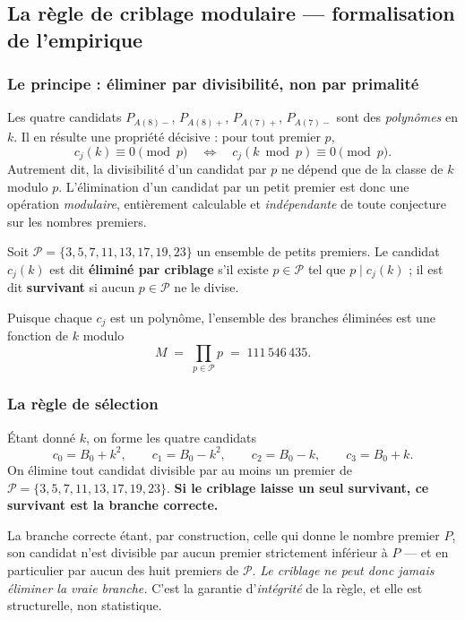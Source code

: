 \subsection{La règle de criblage modulaire --- formalisation de l'empirique}

\subsubsection{Le principe : éliminer par divisibilité, non par primalité}

Les quatre candidats $P_{A(8)-}$, $P_{A(8)+}$, $P_{A(7)+}$, $P_{A(7)-}$ sont des
\emph{polynômes} en $k$. Il en résulte une propriété décisive : pour
tout premier $p$,
\[
  c_j(k) \equiv 0 \!\!\pmod p
  \quad\Longleftrightarrow\quad
  c_j(k \bmod p) \equiv 0 \!\!\pmod p .
\]
Autrement dit, la divisibilité d'un candidat par $p$ ne dépend que de la
classe de $k$ modulo $p$. L'élimination d'un candidat par un petit
premier est donc une opération \emph{modulaire}, entièrement calculable
et \emph{indépendante} de toute conjecture sur les nombres premiers.

\begin{boiteformule}
Soit $\mathcal{P} = \{3,5,7,11,13,17,19,23\}$ un ensemble de petits
premiers. Le candidat $c_j(k)$ est dit \textbf{éliminé par criblage} s'il
existe $p \in \mathcal{P}$ tel que $p \mid c_j(k)$ ; il est dit
\textbf{survivant} si aucun $p \in \mathcal{P}$ ne le divise.
\end{boiteformule}

Puisque chaque $c_j$ est un polynôme, l'ensemble des branches éliminées
est une fonction de $k$ modulo
\[
  M \;=\; \prod_{p \in \mathcal{P}} p \;=\; 111\,546\,435 .
\]

\subsubsection{La règle de sélection}

\begin{boiteformule}
Étant donné $k$, on forme les quatre candidats
\[
  c_0 = B_0+k^{2},\qquad c_1 = B_0-k^{2},\qquad
  c_2 = B_0-k,\qquad c_3 = B_0+k .
\]
On élimine tout candidat divisible par au moins un premier de
$\mathcal{P} = \{3,5,7,11,13,17,19,23\}$. \textbf{Si le criblage laisse un
seul survivant, ce survivant est la branche correcte.}
\end{boiteformule}

\begin{boitenote}
La branche correcte étant, par construction, celle qui donne le
nombre premier $P$, son candidat n'est divisible par aucun premier
strictement inférieur à $P$ --- et en particulier par aucun des huit
premiers de $\mathcal{P}$. \emph{Le criblage ne peut donc jamais
éliminer la vraie branche.} C'est la garantie d'\emph{intégrité} de la
règle, et elle est structurelle, non statistique.
\end{boitenote}


